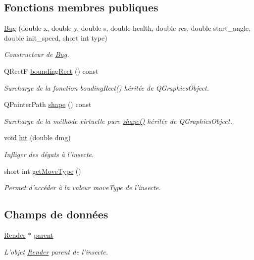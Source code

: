 \subsection*{Fonctions membres publiques}
\begin{DoxyCompactItemize}
\item 
\hyperlink{classBug_a1d3140d50abd44257d5e0b1b6dcb4514}{Bug} (double x, double y, double s, double health, double res, double start\_\-angle, double init\_\-speed, short int type)
\begin{DoxyCompactList}\small\item\em Constructeur de \hyperlink{classBug}{Bug}. \end{DoxyCompactList}\item 
QRectF \hyperlink{classBug_a9b39c25361faad07b1bf2dd927d09dab}{boundingRect} () const 
\begin{DoxyCompactList}\small\item\em Surcharge de la fonction boudingRect() héritée de QGraphicsObject. \end{DoxyCompactList}\item 
QPainterPath \hyperlink{classBug_a587a36d3145c2b4dba6c689af22c65ac}{shape} () const 
\begin{DoxyCompactList}\small\item\em Surcharge de la méthode virtuelle pure \hyperlink{classBug_a587a36d3145c2b4dba6c689af22c65ac}{shape()} héritée de QGraphicsObject. \end{DoxyCompactList}\item 
void \hyperlink{classBug_a63402c05b5ba3fb034e41f1ced0e4b9f}{hit} (double dmg)
\begin{DoxyCompactList}\small\item\em Infliger des dégats à l'insecte. \end{DoxyCompactList}\item 
short int \hyperlink{classBug_aced471cedcfa855baddf4c827003e755}{getMoveType} ()
\begin{DoxyCompactList}\small\item\em Permet d'accéder à la valeur moveType de l'insecte. \end{DoxyCompactList}\end{DoxyCompactItemize}
\subsection*{Champs de données}
\begin{DoxyCompactItemize}
\item 
\hyperlink{classRender}{Render} $\ast$ \hyperlink{classBug_a7a93aae4e4b7a215c94ff85d0bd6e26d}{parent}
\begin{DoxyCompactList}\small\item\em L'objet \hyperlink{classRender}{Render} parent de l'insecte. \end{DoxyCompactList}\end{DoxyCompactItemize}
